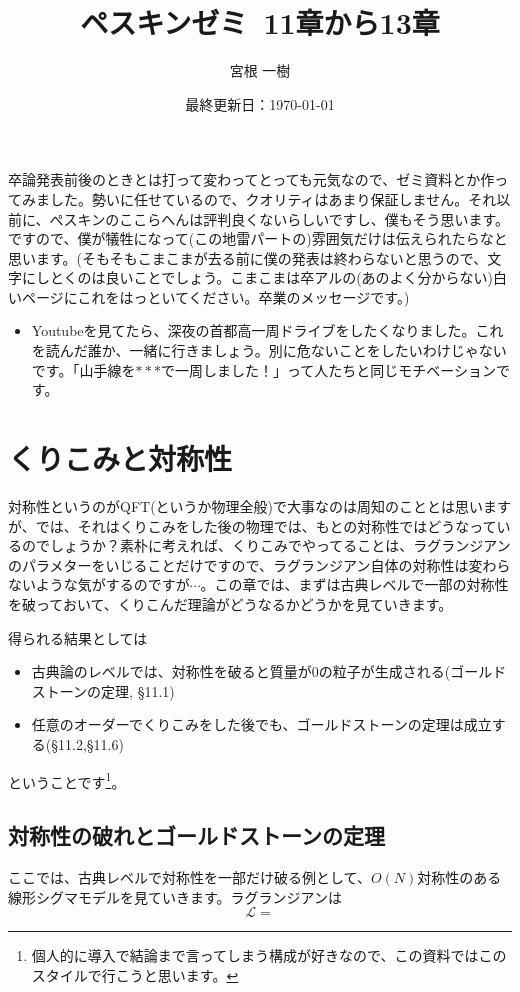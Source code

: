 \documentclass[unicode,a4paper,11pt]{ltjsarticle}
\title{ペスキンゼミ\ 11章から13章}
\author{宮根 一樹}
\date{最終更新日：\today}
\theoremstyle{definition}
\begin{document}
\maketitle

\tableofcontents

\vspace*{10pt}

卒論発表前後のときとは打って変わってとっても元気なので、ゼミ資料とか作ってみました。勢いに任せているので、クオリティはあまり保証しません。それ以前に、ぺスキンのここらへんは評判良くないらしいですし、僕もそう思います。ですので、僕が犠牲になって(この地雷パートの)雰囲気だけは伝えられたらなと思います。(そもそもこまこまが去る前に僕の発表は終わらないと思うので、文字にしとくのは良いことでしょう。こまこまは卒アルの(あのよく分からない)白いページにこれをはっといてください。卒業のメッセージです。)

\vspace*{10pt}

\begin{itemize}
   \item
         Youtubeを見てたら、深夜の首都高一周ドライブをしたくなりました。これを読んだ誰か、一緒に行きましょう。別に危ないことをしたいわけじゃないです。「山手線を$\ast\ast\ast$で一周しました！」って人たちと同じモチベーションです。
\end{itemize}

\clearpage

\section{くりこみと対称性}

対称性というのがQFT(というか物理全般)で大事なのは周知のこととは思いますが、では、それはくりこみをした後の物理では、もとの対称性ではどうなっているのでしょうか？素朴に考えれば、くりこみでやってることは、ラグランジアンのパラメターをいじることだけですので、ラグランジアン自体の対称性は変わらないような気がするのですが$\cdots$。この章では、まずは古典レベルで一部の対称性を破っておいて、くりこんだ理論がどうなるかどうかを見ていきます。

得られる結果としては
\begin{itemize}
   \item
         古典論のレベルでは、対称性を破ると質量が0の粒子が生成される(ゴールドストーンの定理, \S11.1)
   \item
         任意のオーダーでくりこみをした後でも、ゴールドストーンの定理は成立する(\S11.2,\S11.6)
\end{itemize}
ということです\footnote{
   個人的に導入で結論まで言ってしまう構成が好きなので、この資料ではこのスタイルで行こうと思います。
}。

\subsection{対称性の破れとゴールドストーンの定理}

ここでは、古典レベルで対称性を一部だけ破る例として、$O(N)$対称性のある線形シグマモデルを見ていきます。ラグランジアンは
\begin{equation}
   \mathcal{L}
   =
\end{equation}
\end{document}
